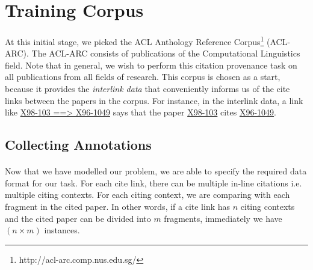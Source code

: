 \section{Training Corpus}
\paragraph{}
At this initial stage, we picked the ACL Anthology Reference Corpus\footnote{http://acl-arc.comp.nus.edu.sg/} (ACL-ARC). The ACL-ARC consists of publications of the Computational Linguistics field. Note that in general, we wish to perform this citation provenance task on all publications from all fields of research. This corpus is chosen as a start, because it provides the \textit{interlink data} that conveniently informs us of the cite links between the papers in the corpus. For instance, in the interlink data, a link like \url{X98-103 ==> X96-1049} says that the paper \url{X98-103} cites \url{X96-1049}.

\subsection{Collecting Annotations}
\paragraph{}
Now that we have modelled our problem, we are able to specify the required data format for our task. For each cite link, there can be multiple in-line citations i.e. multiple citing contexts. For each citing context, we are comparing with each fragment in the cited paper. In other words, if a cite link has $n$ citing contexts and the cited paper can be divided into $m$ fragments, immediately we have $(n \times m)$ instances.

